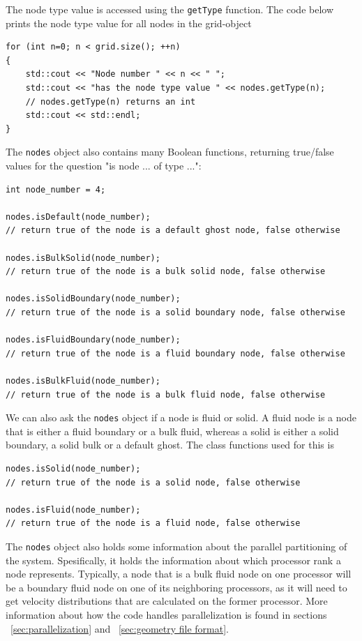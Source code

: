\documentclass[11pt,a4paper]{report}
\begin{document}
The node type value is accessed using the \texttt{getType} function. The code below prints the node type value for all nodes in the grid-object  
\begin{verbatim}
for (int n=0; n < grid.size(); ++n) 
{
    std::cout << "Node number " << n << " ";
    std::cout << "has the node type value " << nodes.getType(n);
    // nodes.getType(n) returns an int
    std::cout << std::endl;
}
\end{verbatim}
The \texttt{nodes} object also contains many Boolean functions, returning true/false values for the question "is node ... of type ...": 
\begin{verbatim}
int node_number = 4;
 
nodes.isDefault(node_number); 
// return true of the node is a default ghost node, false otherwise

nodes.isBulkSolid(node_number); 
// return true of the node is a bulk solid node, false otherwise

nodes.isSolidBoundary(node_number); 
// return true of the node is a solid boundary node, false otherwise

nodes.isFluidBoundary(node_number); 
// return true of the node is a fluid boundary node, false otherwise

nodes.isBulkFluid(node_number); 
// return true of the node is a bulk fluid node, false otherwise
\end{verbatim}
We can also ask the \texttt{nodes} object if a node is fluid or solid. A fluid node is a node that is either a fluid boundary or a bulk fluid, whereas a solid is either a solid boundary, a solid bulk or a default ghost. The class functions used for this is 
\begin{verbatim}
nodes.isSolid(node_number); 
// return true of the node is a solid node, false otherwise

nodes.isFluid(node_number); 
// return true of the node is a fluid node, false otherwise
\end{verbatim}
The \texttt{nodes} object also holds some information about the parallel partitioning of the system. Spesifically, it holds the information about which processor rank a node represents. Typically, a node that is a bulk fluid node on one processor will be a boundary fluid node on one of its neighboring processors, as it will need to get velocity distributions that are calculated on the former processor. More information about how the code handles parallelization is found in sections ~\ref{sec:parallelization} and ~\ref{sec:geometry file format}. 
\end{document}

